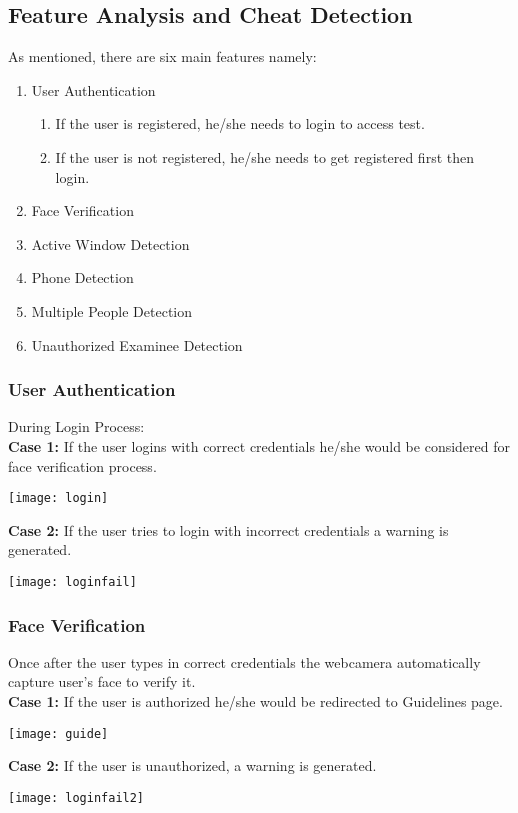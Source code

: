 \documentclass[12pt]{report}
\begin{document}
\subsection{Feature Analysis and Cheat Detection}
As mentioned, there are six main features namely:
\begin{enumerate}
\item User Authentication
\begin{enumerate}
\item If the user is registered, he/she needs to login to access test.
\item If the user is not registered, he/she needs to get registered first then login.
\end{enumerate}
\item Face Verification
\item Active Window Detection
\item Phone Detection
\item Multiple People Detection
\item Unauthorized Examinee Detection
\end{enumerate}
\subsubsection{User Authentication}
During Login Process:\\
\textbf{Case 1:} If the user logins with correct credentials he/she would be considered for face verification process.\\
\begin{center}
\texttt{[image: login]}
\end{center}
\textbf{Case 2:} If the user tries to login with incorrect credentials a warning is generated.
\begin{center}
\texttt{[image: loginfail]}
\end{center}
\subsubsection{Face Verification}
Once after the user types in correct credentials the webcamera automatically capture user's face to verify it.\\
\textbf{Case 1:} If the user is authorized he/she would be redirected to Guidelines page.\\
\begin{center}
\texttt{[image: guide]}
\end{center}
\textbf{Case 2:} If the user is unauthorized, a warning is generated.
\begin{center}
\texttt{[image: loginfail2]}
\end{center}
\end{document}
